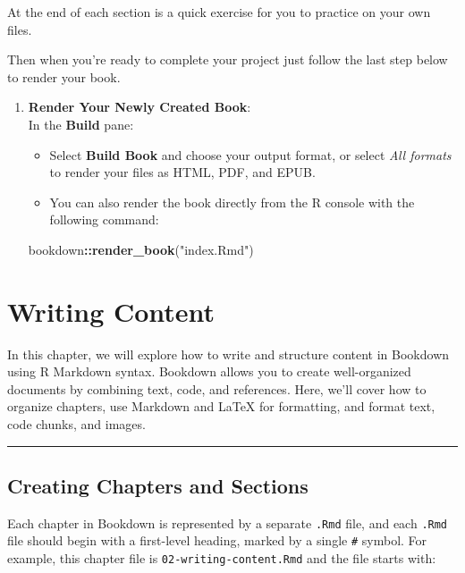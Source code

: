 \documentclass[
]{book}
\newenvironment{Shaded}{\begin{snugshade}}{\end{snugshade}}
\newcommand{\FunctionTok}[1]{\textcolor[rgb]{0.13,0.29,0.53}{\textbf{#1}}}
\newcommand{\NormalTok}[1]{#1}
\newcommand{\SpecialCharTok}[1]{\textcolor[rgb]{0.81,0.36,0.00}{\textbf{#1}}}
\newcommand{\StringTok}[1]{\textcolor[rgb]{0.31,0.60,0.02}{#1}}
\providecommand{\tightlist}{%
  \setlength{\itemsep}{0pt}\setlength{\parskip}{0pt}}
\theoremstyle{definition}
\theoremstyle{definition}
\theoremstyle{definition}
\theoremstyle{definition}
\theoremstyle{remark}
\begin{document}
At the end of each section is a quick exercise for you to practice on your own files.

Then when you're ready to complete your project just follow the last step below to render your book.

\begin{enumerate}
\def\labelenumi{\arabic{enumi}.}
\setcounter{enumi}{5}
\tightlist
\item
  \textbf{Render Your Newly Created Book}:\\
  In the \textbf{Build} pane:

  \begin{itemize}
  \tightlist
  \item
    Select \textbf{Build Book} and choose your output format, or select \emph{All formats} to render your files as HTML, PDF, and EPUB.
  \item
    You can also render the book directly from the R console with the following command:
  \end{itemize}

\begin{Shaded}
\begin{Highlighting}[]
\NormalTok{bookdown}\SpecialCharTok{::}\FunctionTok{render\_book}\NormalTok{(}\StringTok{"index.Rmd"}\NormalTok{)}
\end{Highlighting}
\end{Shaded}
\end{enumerate}

\chapter{Writing Content}\label{chapter3}

In this chapter, we will explore how to write and structure content in Bookdown using R Markdown syntax. Bookdown allows you to create well-organized documents by combining text, code, and references. Here, we'll cover how to organize chapters, use Markdown and LaTeX for formatting, and format text, code chunks, and images.

\begin{center}\rule{0.5\linewidth}{0.5pt}\end{center}

\section{Creating Chapters and Sections}\label{creating-chapters-and-sections}

Each chapter in Bookdown is represented by a separate \texttt{.Rmd} file, and each \texttt{.Rmd} file should begin with a first-level heading, marked by a single \texttt{\#} symbol. For example, this chapter file is \texttt{02-writing-content.Rmd} and the file starts with:
\end{document}
